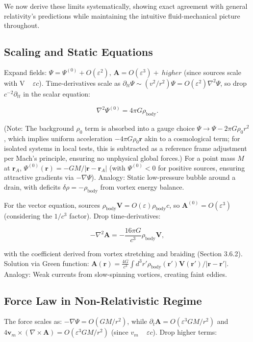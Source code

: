 \documentclass{article}
\begin{document}
We now derive these limits systematically, showing exact agreement with general relativity's predictions while maintaining the intuitive fluid-mechanical picture throughout.

\subsection{Scaling and Static Equations}

Expand fields: $\Psi = \Psi^{(0)} + O(\varepsilon^2)$, $\mathbf{A} = O(\varepsilon^3) + \ higher$ (since sources scale with V ~ $\varepsilon c$). Time-derivatives scale as $\partial_{tt} \Psi \sim (v^2 / r^2) \Psi = O(\varepsilon^2) \nabla^2 \Psi$, so drop $c^{-2} \partial_{tt}$ in the scalar equation:

\[
\nabla^2 \Psi^{(0)} = 4\pi G \rho_{\text{body}}.
\]

(Note: The background $\rho_0$ term is absorbed into a gauge choice $\Psi \to \Psi - 2\pi G \rho_0 r^2$, which implies uniform acceleration $-4\pi G \rho_0 \mathbf{r}$ akin to a cosmological term; for isolated systems in local tests, this is subtracted as a reference frame adjustment per Mach's principle, ensuring no unphysical global forces.) For a point mass $M$ at $\mathbf{r}_A$, $\Psi^{(0)}(\mathbf{r}) = -GM / |\mathbf{r} - \mathbf{r}_A|$ (with $\Psi^{(0)} < 0$ for positive sources, ensuring attractive gradients via $-\nabla \Psi$). Analogy: Static low-pressure bubble around a drain, with deficits $\delta \rho = -\rho_{\text{body}}$ from vortex energy balance.

For the vector equation, sources $\rho_{\text{body}} \mathbf{V} = O(\varepsilon) \rho_{\text{body}} c$, so $\mathbf{A}^{(0)} = O(\varepsilon^3)$ (considering the $1/c^3$ factor). Drop time-derivatives:

\[
- \nabla^2 \mathbf{A} = -\frac{16\pi G}{c^3} \rho_{\text{body}} \mathbf{V},
\]

with the coefficient derived from vortex stretching and braiding (Section 3.6.2). Solution via Green function: $\mathbf{A}(\mathbf{r}) = \frac{4 G}{c^3} \int d^3 r' \rho_{\text{body}}(\mathbf{r}') \mathbf{V}(\mathbf{r}') / |\mathbf{r} - \mathbf{r}'|$. Analogy: Weak currents from slow-spinning vortices, creating faint eddies.

\subsection{Force Law in Non-Relativistic Regime}

The force scales as: $-\nabla \Psi = O(GM/r^2)$, while $\partial_t \mathbf{A} = O(\varepsilon^3 GM/r^2)$ and $4 \mathbf{v}_m \times (\nabla \times \mathbf{A}) = O(\varepsilon^3 GM/r^2)$ (since $v_m$ ~ $\varepsilon c$). Drop higher terms:
\end{document}
